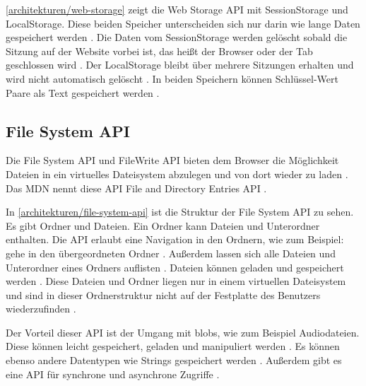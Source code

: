 
\autoref{architekturen/web-storage} zeigt die Web Storage \ac{API} mit SessionStorage und LocalStorage. Diese beiden Speicher unterscheiden sich nur darin wie lange Daten gespeichert werden \autocite{Hajian2019} \autocite{mdn-web-storage}. Die Daten vom SessionStorage werden gelöscht sobald die Sitzung auf der Website vorbei ist, das heißt der Browser oder der Tab geschlossen wird \autocite{Hajian2019} \autocite{mdn-web-storage}. Der LocalStorage bleibt über mehrere Sitzungen erhalten und wird nicht automatisch gelöscht \autocite{Hajian2019} \autocite{mdn-web-storage}. In beiden Speichern können Schlüssel-Wert Paare als Text gespeichert werden \autocite{Hajian2019} \autocite{mdn-web-storage}.

\subsection{File System API}
Die File System \ac{API} und FileWrite \ac{API} bieten dem Browser die Möglichkeit Dateien in ein virtuelles Dateisystem abzulegen und von dort wieder zu laden \autocite{Hajian2019} \autocite{storage-for-the-web}. Das \ac{MDN} nennt diese \ac{API} File and Directory Entries \ac{API} \autocite{mdn-file-system}. 


In \autoref{architekturen/file-system-api} ist die Struktur der File System \ac{API} zu sehen. Es gibt Ordner und Dateien. Ein Ordner kann Dateien und Unterordner enthalten. Die \ac{API} erlaubt eine Navigation in den Ordnern, wie zum Beispiel: gehe in den übergeordneten Ordner \autocite{mdn-file-system}. Außerdem lassen sich alle Dateien und Unterordner eines Ordners auflisten \autocite{mdn-file-system}. Dateien können geladen und gespeichert werden \autocite{mdn-file-system}. Diese Dateien und Ordner liegen nur in einem virtuellen Dateisystem und sind in dieser Ordnerstruktur nicht auf der Festplatte des Benutzers wiederzufinden \autocite{mdn-file-system}.

Der Vorteil dieser \ac{API} ist der Umgang mit \acp{blob}, wie zum Beispiel Audiodateien. Diese können leicht gespeichert, geladen und manipuliert werden \autocite{mdn-file-system}. Es können ebenso andere Datentypen wie Strings gespeichert werden \autocite{mdn-file-system}. Außerdem gibt es eine \ac{API} für synchrone und asynchrone Zugriffe \autocite{Hajian2019}. 

